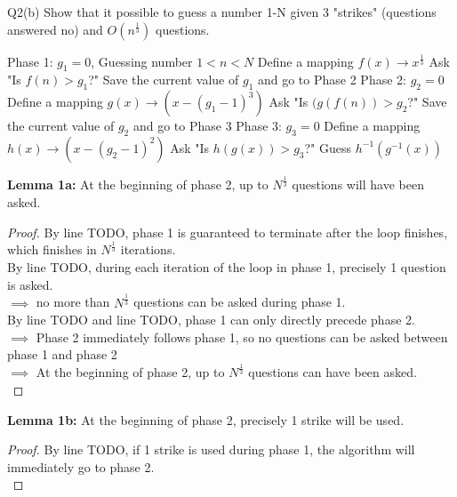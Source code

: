 \begin{problem}
  {Q2(b)}
  Show that it possible to guess a number 1-N given 3 "strikes" (questions answered no) and $O(n^{\frac{1}{3}})$ questions. \\
  \begin{algorithmic}[1]
    \STATE Phase 1: $g_1 = 0$, Guessing number $1 < n < N$
    \STATE Define a mapping $f(x) \rightarrow x^{\frac{1}{3}}$
    \STATE Ask "Is $f(n) > g_1$?"
    \STATE Save the current value of $g_1$ and go to Phase 2
    \ENDIF
    \ENDFOR
    \STATE Phase 2: $g_2 = 0$
    \STATE Define a mapping $g(x) \rightarrow (x - (g_1 - 1)^3)$
    \STATE Ask "Is $(g(f(n)) > g_2$?"
    \STATE Save the current value of $g_2$ and go to Phase 3
    \ENDIF
    \ENDFOR
    \STATE Phase 3: $g_3 = 0$
    \STATE Define a mapping $h(x) \rightarrow (x - (g_2 - 1)^2)$
    \STATE Ask "Is $h(g(x)) > g_3$?"
    \STATE Guess $h^{-1}(g^{-1}(x))$
    \ENDIF
    \ENDFOR
  \end{algorithmic}
  \textbf{Lemma 1a:} At the beginning of phase 2, up to $N^{\frac{1}{3}}$ questions will have been asked. \\
  \begin{proof}
    By line TODO, phase 1 is guaranteed to terminate after the loop finishes, which finishes in $N^{\frac{1}{3}}$ iterations. \\
    By line TODO, during each iteration of the loop in phase 1, precisely 1 question is asked. \\
    $\implies $ no more than $N^{\frac{1}{3}}$ questions can be asked during phase 1. \\
    By line TODO and line TODO, phase 1 can only directly precede phase 2. \\
    $\implies $ Phase 2 immediately follows phase 1, so no questions can be asked between phase 1 and phase 2 \\
    $\implies $ At the beginning of phase 2, up to $N^{\frac{1}{3}}$ questions can have been asked. \\
  \end{proof}
  \textbf{Lemma 1b:} At the beginning of phase 2, precisely 1 strike will be used. \\
  \begin{proof}
    By line TODO, if 1 strike is used during phase 1, the algorithm will immediately go to phase 2. \\

\end{proof}
\end{problem}
